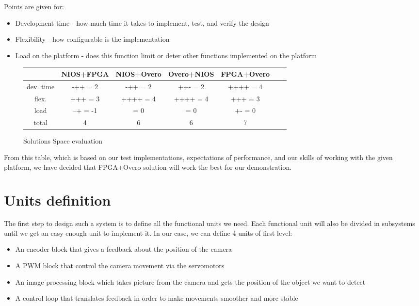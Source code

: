 Points are given for:
\begin{itemize}
 \item Development time - how much time it takes to implement, test, and verify the design
 \item Flexibility - how configurable is the implementation
 \item Load on the platform - does this function limit or deter other functions implemented on the platform
\end{itemize}

\begin{figure}[!ht]
\hspace{-1cm}
   \centering
\begin{tabular}{|c|c|c|c|c|c|c|}\hline
            & NIOS+FPGA & NIOS+Overo &      Overo+NIOS & FPGA+Overo \\\hline
dev. time   & -++ = 2       & -++ = 2       & ++- = 2        & ++++ = 4\\\hline
flex.       & +++ = 3       & ++++ = 4      & ++++ = 4      & +++ = 3\\\hline
load        & --+ = -1      & = 0           & = 0          & +- = 0\\\hline
total       & 4         & 6          & 6          & 7\\\hline
\end{tabular}
\caption{Solutions Space evaluation}
\end{figure}

From this table, which is based on our test implementations, expectations of performance, and our skills of working with the given platform, we have decided that FPGA+Overo solution will work the best for our demonstration. 


\section{Units definition}

The first step to design such a system is  to define all the functional units we need. Each functional unit will also be divided in subsystems until we get an easy enough unit to implement it. In our case, we can define 4 units of first level: 

\begin{itemize}
 \item An encoder block that gives a feedback about the position of the camera
 \item A PWM block that control the camera movement via the servomotors
 \item An image processing block which takes picture from the camera and gets the position of the object we want to detect
 \item A control loop that translates feedback in order to make movements smoother and more stable
\end{itemize}

